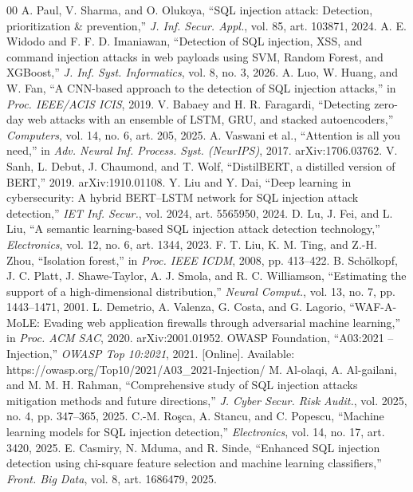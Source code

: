 \documentclass[conference]{IEEEtran}
\begin{document}
\begin{thebibliography}{00}
 A. Paul, V. Sharma, and O. Olukoya, ``SQL injection attack: Detection, prioritization \& prevention,'' \emph{J. Inf. Secur. Appl.}, vol. 85, art. 103871, 2024.
 A. E. Widodo and F. F. D. Imaniawan, ``Detection of SQL injection, XSS, and command injection attacks in web payloads using SVM, Random Forest, and XGBoost,'' \emph{J. Inf. Syst. Informatics}, vol. 8, no. 3, 2026.
 A. Luo, W. Huang, and W. Fan, ``A CNN-based approach to the detection of SQL injection attacks,'' in \emph{Proc. IEEE/ACIS ICIS}, 2019.
 V. Babaey and H. R. Faragardi, ``Detecting zero-day web attacks with an ensemble of LSTM, GRU, and stacked autoencoders,'' \emph{Computers}, vol. 14, no. 6, art. 205, 2025.
 A. Vaswani et al., ``Attention is all you need,'' in \emph{Adv. Neural Inf. Process. Syst. (NeurIPS)}, 2017. arXiv:1706.03762.
 V. Sanh, L. Debut, J. Chaumond, and T. Wolf, ``DistilBERT, a distilled version of BERT,'' 2019. arXiv:1910.01108.
 Y. Liu and Y. Dai, ``Deep learning in cybersecurity: A hybrid BERT--LSTM network for SQL injection attack detection,'' \emph{IET Inf. Secur.}, vol. 2024, art. 5565950, 2024.
 D. Lu, J. Fei, and L. Liu, ``A semantic learning-based SQL injection attack detection technology,'' \emph{Electronics}, vol. 12, no. 6, art. 1344, 2023.
 F. T. Liu, K. M. Ting, and Z.-H. Zhou, ``Isolation forest,'' in \emph{Proc. IEEE ICDM}, 2008, pp. 413--422.
 B. Sch\"olkopf, J. C. Platt, J. Shawe-Taylor, A. J. Smola, and R. C. Williamson, ``Estimating the support of a high-dimensional distribution,'' \emph{Neural Comput.}, vol. 13, no. 7, pp. 1443--1471, 2001.
 L. Demetrio, A. Valenza, G. Costa, and G. Lagorio, ``WAF-A-MoLE: Evading web application firewalls through adversarial machine learning,'' in \emph{Proc. ACM SAC}, 2020. arXiv:2001.01952.
 OWASP Foundation, ``A03:2021 -- Injection,'' \emph{OWASP Top 10:2021}, 2021. [Online]. Available: https://owasp.org/Top10/2021/A03\_2021-Injection/
 M. Al-olaqi, A. Al-gailani, and M. M. H. Rahman, ``Comprehensive study of SQL injection attacks mitigation methods and future directions,'' \emph{J. Cyber Secur. Risk Audit.}, vol. 2025, no. 4, pp. 347--365, 2025.
 C.-M. Ro\c{s}ca, A. Stancu, and C. Popescu, ``Machine learning models for SQL injection detection,'' \emph{Electronics}, vol. 14, no. 17, art. 3420, 2025.
 E. Casmiry, N. Mduma, and R. Sinde, ``Enhanced SQL injection detection using chi-square feature selection and machine learning classifiers,'' \emph{Front. Big Data}, vol. 8, art. 1686479, 2025.
\end{thebibliography}
\end{document}
